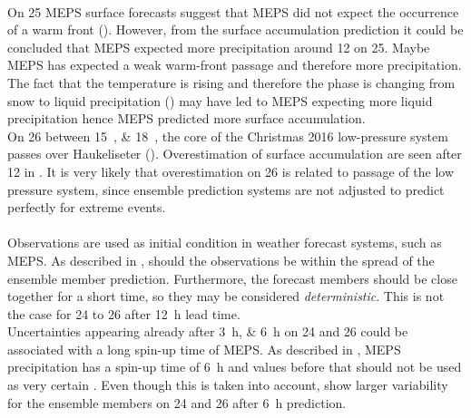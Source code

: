 \\
On \SI{25}{\dec} MEPS surface forecasts suggest that MEPS did not expect the occurrence of a warm front (). 
However, from the surface accumulation prediction 
it could be concluded that MEPS expected more precipitation around \SI{12}{\UTC} on \SI{25}{\dec}. Maybe MEPS has expected a weak warm-front passage and therefore more precipitation. The fact that the temperature is rising and therefore the phase is changing from snow to liquid precipitation () may have led to MEPS expecting more liquid precipitation%
hence MEPS predicted more surface accumulation.
\\
On \SI{26}{\dec} between \SIlist{15;18}{\UTC}, the core of the Christmas 2016 low-pressure system passes over Haukeliseter (). Overestimation of surface accumulation are seen after \SI{12}{\UTC} in . It is very likely that overestimation on \SI{26}{\dec} is related to passage of the low pressure system, since ensemble prediction systems are not adjusted to predict perfectly for extreme events.
\\
\\
Observations are used as initial condition in weather forecast systems, such as MEPS.
As described in , should the observations be within the spread of the ensemble member prediction. Furthermore, the forecast members should be close together for a short time, so they may be considered \textit{deterministic}. 
This is not the case for \num{24} to \SI{26}{\dec} after \SI{12}{\hour} lead time.
\\
Uncertainties appearing already after \SIlist{3;6}{\hour} on \num{24} and \SI{26}{\dec} could be associated with a long spin-up time of MEPS. As described in , MEPS precipitation has a spin-up time of \SI{6}{\hour} and values before that should not be used as very certain \citep[][personal communication]{Priv_Comm_Koltzow}. Even though this is taken into account,  show larger variability for the ensemble members on \num{24} and \SI{26}{\dec} after \SI{6}{\hour} prediction.
